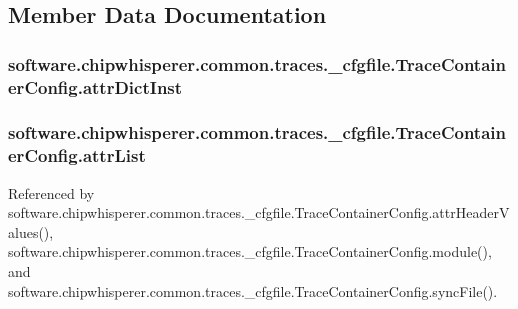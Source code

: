 \subsection{Member Data Documentation}
\hypertarget{classsoftware_1_1chipwhisperer_1_1common_1_1traces_1_1__cfgfile_1_1TraceContainerConfig_a077f17e52165a436ad5390b2fe244ecd}{}
\subsubsection[{attr\+Dict\+Inst}]{\setlength{\rightskip}{0pt plus 5cm}software.\+chipwhisperer.\+common.\+traces.\+\_\+cfgfile.\+Trace\+Container\+Config.\+attr\+Dict\+Inst}\label{classsoftware_1_1chipwhisperer_1_1common_1_1traces_1_1__cfgfile_1_1TraceContainerConfig_a077f17e52165a436ad5390b2fe244ecd}
\hypertarget{classsoftware_1_1chipwhisperer_1_1common_1_1traces_1_1__cfgfile_1_1TraceContainerConfig_a50e6444b02d5847a6afbb976b45a200b}{}
\subsubsection[{attr\+List}]{\setlength{\rightskip}{0pt plus 5cm}software.\+chipwhisperer.\+common.\+traces.\+\_\+cfgfile.\+Trace\+Container\+Config.\+attr\+List}\label{classsoftware_1_1chipwhisperer_1_1common_1_1traces_1_1__cfgfile_1_1TraceContainerConfig_a50e6444b02d5847a6afbb976b45a200b}


Referenced by software.\+chipwhisperer.\+common.\+traces.\+\_\+cfgfile.\+Trace\+Container\+Config.\+attr\+Header\+Values(), software.\+chipwhisperer.\+common.\+traces.\+\_\+cfgfile.\+Trace\+Container\+Config.\+module(), and software.\+chipwhisperer.\+common.\+traces.\+\_\+cfgfile.\+Trace\+Container\+Config.\+sync\+File().


